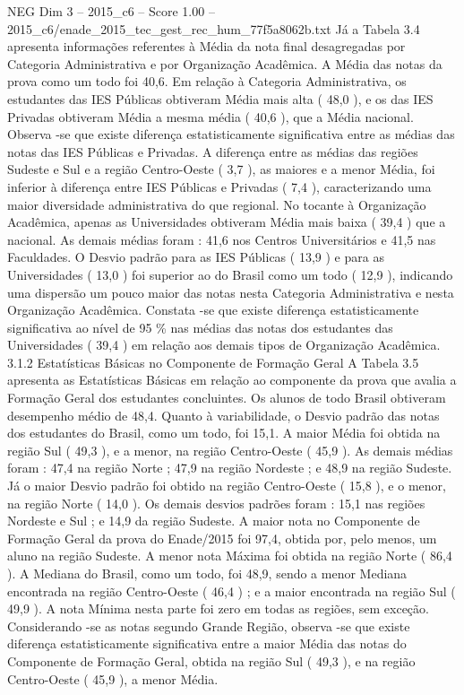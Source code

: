 \begin{textsample}{NEG Dim 3 – 2015\_c6 – Score 1.00 – 2015\_c6/enade\_2015\_tec\_gest\_rec\_hum\_77f5a8062b.txt}
Já a Tabela 3.4 apresenta informações referentes à Média da nota final desagregadas por Categoria Administrativa e por Organização Acadêmica.
A Média das notas da prova como um todo foi 40,6.
Em relação à Categoria Administrativa, os estudantes das IES Públicas obtiveram Média mais alta ( 48,0 ), e os das IES Privadas obtiveram Média a mesma média ( 40,6 ), que a Média nacional.
Observa -se que existe diferença estatisticamente significativa entre as médias das notas das IES Públicas e Privadas.
A diferença entre as médias das regiões Sudeste e Sul e a região Centro-Oeste ( 3,7 ), as maiores e a menor Média, foi inferior à diferença entre IES Públicas e Privadas ( 7,4 ), caracterizando uma maior diversidade administrativa do que regional.
No tocante à Organização Acadêmica, apenas as Universidades obtiveram Média mais baixa ( 39,4 ) que a nacional.
As demais médias foram : 41,6 nos Centros Universitários e 41,5 nas Faculdades.
O Desvio padrão para as IES Públicas ( 13,9 ) e para as Universidades ( 13,0 ) foi superior ao do Brasil como um todo ( 12,9 ), indicando uma dispersão um pouco maior das notas nesta Categoria Administrativa e nesta Organização Acadêmica.
Constata -se que existe diferença estatisticamente significativa ao nível de 95 \% nas médias das notas dos estudantes das Universidades ( 39,4 ) em relação aos demais tipos de Organização Acadêmica. 3.1.2 Estatísticas Básicas no Componente de Formação Geral A Tabela 3.5 apresenta as Estatísticas Básicas em relação ao componente da prova que avalia a Formação Geral dos estudantes concluintes.
Os alunos de todo Brasil obtiveram desempenho médio de 48,4.
Quanto à variabilidade, o Desvio padrão das notas dos estudantes do Brasil, como um todo, foi 15,1.
A maior Média foi obtida na região Sul ( 49,3 ), e a menor, na região Centro-Oeste ( 45,9 ).
As demais médias foram : 47,4 na região Norte ; 47,9 na região Nordeste ; e 48,9 na região Sudeste.
Já o maior Desvio padrão foi obtido na região Centro-Oeste ( 15,8 ), e o menor, na região Norte ( 14,0 ).
Os demais desvios padrões foram : 15,1 nas regiões Nordeste e Sul ; e 14,9 da região Sudeste.
A maior nota no Componente de Formação Geral da prova do Enade/2015 foi 97,4, obtida por, pelo menos, um aluno na região Sudeste.
A menor nota Máxima foi obtida na região Norte ( 86,4 ).
A Mediana do Brasil, como um todo, foi 48,9, sendo a menor Mediana encontrada na região Centro-Oeste ( 46,4 ) ; e a maior encontrada na região Sul ( 49,9 ).
A nota Mínima nesta parte foi zero em todas as regiões, sem exceção.
Considerando -se as notas segundo Grande Região, observa -se que existe diferença estatisticamente significativa entre a maior Média das notas do Componente de Formação Geral, obtida na região Sul ( 49,3 ), e na região Centro-Oeste ( 45,9 ), a menor Média.

\end{textsample}

